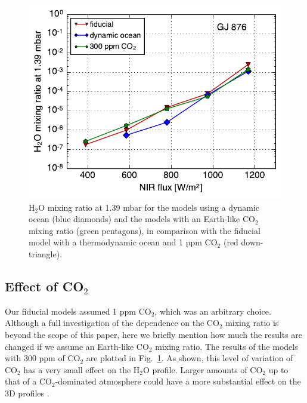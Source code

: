 \documentclass[11pt,numberedappendix,twocolappendix,]{emulateapj}
\def\water{H$_2$O }
\begin{document}
\begin{figure}[!h]
    \begin{center}
    \includegraphics[width=0.9\hsize]{fig/xH2O_sensitivity.pdf}
    \end{center}
\caption{\water mixing ratio at 1.39 mbar for the models using a dynamic ocean (blue diamonds) and the models with an Earth-like CO$_2$ mixing ratio (green pentagons), in comparison with the fiducial model with a thermodynamic ocean and 1 ppm CO$_2$ (red down-triangle). }
\label{fig:change_ocean}
\end{figure}

\subsection{Effect of CO$_2$}
\label{ss:sensitivity_ocean}

Our fiducial models assumed 1 ppm CO$_2$, which was an arbitrary choice. 
Although a full investigation of the dependence on the CO$_2$ mixing ratio is beyond the scope of this paper, here we briefly mention how much the results are changed if we assume an Earth-like CO$_2$ mixing ratio. 
The results of the models with 300 ppm of CO$_2$ are plotted in Fig.~\ref{fig:change_ocean}. 
As shown, this level of variation of CO$_2$ has a very small effect on the \water profile. 
Larger amounts of CO$_2$ up to that of a CO$_2$-dominated atmosphere could have a more substantial effect on the 3D profiles \citep{Wordsworth2013}. 


\end{document}
